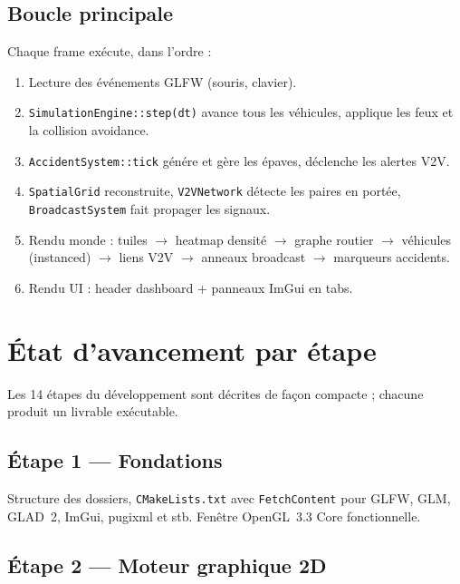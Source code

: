\documentclass[a4paper,11pt]{article}
\begin{document}
\subsection{Boucle principale}

Chaque frame ex\'ecute, dans l'ordre :

\begin{enumerate}
\item Lecture des \'ev\'enements GLFW (souris, clavier).
\item \texttt{SimulationEngine::step(dt)} \textemdash{} avance tous les
      v\'ehicules, applique les feux et la collision avoidance.
\item \texttt{AccidentSystem::tick} \textemdash{} g\'en\'ere et g\`ere les
      \'epaves, d\'eclenche les alertes V2V.
\item \texttt{SpatialGrid} reconstruite, \texttt{V2VNetwork} d\'etecte les
      paires en port\'ee, \texttt{BroadcastSystem} fait propager les signaux.
\item Rendu monde : tuiles $\rightarrow$ heatmap densit\'e $\rightarrow$ graphe
      routier $\rightarrow$ v\'ehicules (instanced) $\rightarrow$ liens V2V
      $\rightarrow$ anneaux broadcast $\rightarrow$ marqueurs accidents.
\item Rendu UI : header dashboard + panneaux ImGui en tabs.
\end{enumerate}

\section{\'Etat d'avancement par \'etape}

Les 14 \'etapes du d\'eveloppement sont d\'ecrites de fa\c{c}on compacte ;
chacune produit un livrable ex\'ecutable.

\subsection*{\'Etape 1 — Fondations}

Structure des dossiers, \texttt{CMakeLists.txt} avec \texttt{FetchContent}
pour GLFW, GLM, GLAD~2, ImGui, pugixml et stb. Fen\^etre OpenGL~3.3 Core
fonctionnelle.

\subsection*{\'Etape 2 — Moteur graphique 2D}
\end{document}
